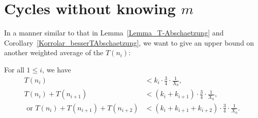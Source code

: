 \documentclass[12pt,reqno]{article}
\begin{document}
\section{Cycles without knowing $m$}\label{section5}
In a manner similar to that in Lemma~\ref{Lemma_T-Abschaetzung} and Corollary~\ref{Korrolar_besserTAbschaetzung}, we want to give an upper bound on another weighted average of the $T(n_i)$:

\begin{lemma}\label{Lemma_T-Abschaetzung_ohne_m}
For all $1\leq i$, we have 
\begin{align*}
T(n_i) & < k_i \cdot \frac{3}{4} \cdot\frac{1}{X_0},\\
T(n_i) + T(n_{i+1}) & < (k_i+k_{i+1}) \cdot \frac{3}{4} \cdot\frac{1}{X_0}, \\
\text{ or } T(n_i) + T(n_{i+1})  + T(n_{i+2}) & < (k_i+k_{i+1}+k_{i+2}) \cdot \frac{3}{4} \cdot\frac{1}{X_0}.
\end{align*}
\end{lemma}
\end{document}
